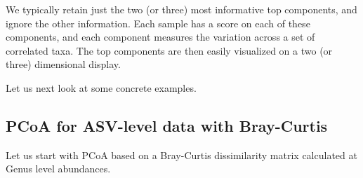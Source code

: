 \documentclass[
]{book}
\begin{document}
We typically retain just the two (or three) most informative top
components, and ignore the other information. Each sample has a score
on each of these components, and each component measures the variation
across a set of correlated taxa. The top components are then easily
visualized on a two (or three) dimensional display.

Let us next look at some concrete examples.

\hypertarget{pcoa-for-asv-level-data-with-bray-curtis}{%
\subsection{PCoA for ASV-level data with Bray-Curtis}\label{pcoa-for-asv-level-data-with-bray-curtis}}

Let us start with PCoA based on a Bray-Curtis dissimilarity matrix
calculated at Genus level abundances.
\end{document}
